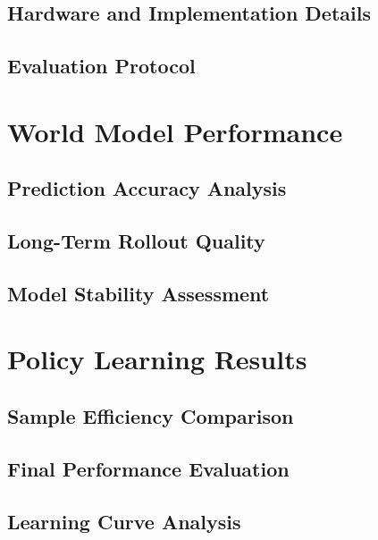 \documentclass[
	english,
	ruledheaders=section,
	class=report,
	thesis={type=master},
	accentcolor=9c,
	custommargins=true,
	marginpar=false,
	parskip=half-,
	fontsize=11pt,
]{tudapub}
\begin{document}
\subsection{Hardware and Implementation Details}
\label{subsec:hardware}

\subsection{Evaluation Protocol}
\label{subsec:eval_protocol}

\section{World Model Performance}
\label{sec:world_model_perf}

\subsection{Prediction Accuracy Analysis}
\label{subsec:prediction_accuracy}

\subsection{Long-Term Rollout Quality}
\label{subsec:rollout_quality}

\subsection{Model Stability Assessment}
\label{subsec:stability}

\section{Policy Learning Results}
\label{sec:policy_results}

\subsection{Sample Efficiency Comparison}
\label{subsec:sample_efficiency_comp}

\subsection{Final Performance Evaluation}
\label{subsec:final_performance}

\subsection{Learning Curve Analysis}
\label{subsec:learning_curves}
\end{document}
